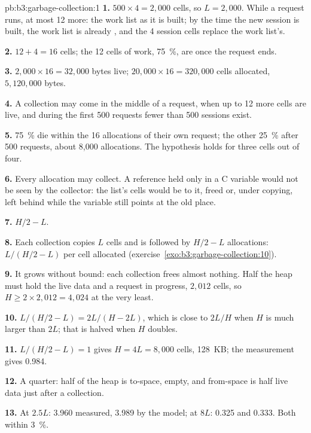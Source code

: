 \begin{solution}{pb:b3:garbage-collection:1}
\textbf{1.} $500 \times 4 = 2{,}000$ cells, so $L = 2{,}000$. While a request runs, at most 12 more: the work list as it is built; by the time the new session is built, the work list is already , and the 4 session cells replace the work list's.

\textbf{2.} $12 + 4 = 16$ cells; the 12 cells of work, 75~\%, are  once the request ends.

\textbf{3.} $2{,}000 \times 16 = 32{,}000$ bytes live; $20{,}000 \times 16 = 320{,}000$ cells allocated, $5{,}120{,}000$ bytes.

\textbf{4.} A collection may come in the middle of a request, when up to 12 more cells are live, and during the first 500 requests fewer than 500 sessions exist.

\textbf{5.} 75~\% die within the 16 allocations of their own request; the other 25~\% after 500 requests, about 8,000 allocations. The hypothesis holds for three cells out of four.

\textbf{6.} Every allocation may collect. A reference held only in a C variable would not be seen by the collector: the list's cells would be  to it, freed or, under copying, left behind while the variable still points at the old place.

\textbf{7.} $H/2 - L$.

\textbf{8.} Each collection copies $L$ cells and is followed by $H/2 - L$ allocations: $L/(H/2 - L)$ per cell allocated (exercise~\ref{exo:b3:garbage-collection:10}).

\textbf{9.} It grows without bound: each collection frees almost nothing. Half the heap must hold the live data and a request in progress, $2{,}012$ cells, so $H \ge 2 \times 2{,}012 = 4{,}024$ at the very least.

\textbf{10.} $L/(H/2 - L) = 2L/(H - 2L)$, which is close to $2L/H$ when $H$ is much larger than $2L$; that is halved when $H$ doubles.

\textbf{11.} $L/(H/2 - L) = 1$ gives $H = 4L = 8{,}000$ cells, 128~KB; the measurement gives 0.984.

\textbf{12.} A quarter: half of the heap is to-space, empty, and from-space is half live data just after a collection.

\textbf{13.} At $2.5L$: 3.960 measured, 3.989 by the model; at $8L$: 0.325 and 0.333. Both within 3~\%.


\end{solution}
